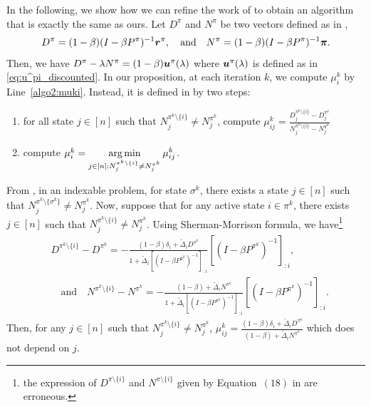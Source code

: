\documentclass[acmsmall,screen,anonymous]{acmart}
\begin{document}
In the following, we show how we can refine the work of \cite{akbarzadeh2020conditions} to obtain an algorithm that is exactly the same as ours.
Let $D^{\pi}$ and $N^{\pi}$ be two vectors defined as in \cite{akbarzadeh2020conditions},
\begin{align*}
    D^{\pi} =(1-\beta)(I-\beta P^\pi)^{-1}\boldsymbol{r}^{\pi}, \quad\text{and}\quad
    N^{\pi} =(1-\beta)(I-\beta P^\pi)^{-1}\boldsymbol{\pi}.
\end{align*}
Then, we have $D^{\pi} -\lambda N^{\pi}=(1-\beta)\boldsymbol{u}^{\pi}(\lambda)$ where $\boldsymbol{u}^{\pi}(\lambda)$ is defined as in \eqref{eq:u^pi_discounted}. In our proposition, at each iteration $k$, we compute $\mu_i^k$ by Line~\ref{algo2:muki}. Instead, it is defined in \cite{akbarzadeh2020conditions} by two steps:
\begin{enumerate}
\item for all state $j\in[n]$ such that $N_j^{\pi^k\setminus\{i\}}\neq N_j^{\pi^k}$, compute $\mu^k_{ij}=\displaystyle\frac{D_j^{\pi^k\setminus\{i\}} -D_j^{\pi^k}}{ N_j^{\pi^k\setminus\{i\}} -N_j^{\pi^k}}$ 
\item \label{it:mu^k_i*} compute $\mu^k_i=\displaystyle\operatorname*{arg\,min}_{j\in[n]:N_j^{\pi^k\setminus\{i\}}\neq N_j^{\pi^k}} \mu^k_{ij}$.
\end{enumerate}
From \cite[Theorem 2]{akbarzadeh2020conditions}, in an indexable problem, for state $\sigma^k$, there exists a state $j\in[n]$ such that $N_j^{\pi^k\setminus\{\sigma^k\}}\neq N_j^{\pi^k}$. Now, suppose that for any active state $i\in\pi^k$, there exists $j\in[n]$ such that $N_j^{\pi^k\setminus\{i\}}\neq N_j^{\pi^k}$. Using Sherman-Morrison formula, we have\footnote{the expression of $D^{\pi\setminus\{i\}}$ and $N^{\pi\setminus\{i\}}$ given by Equation~$(18)$ in \cite{akbarzadeh2020conditions} are erroneous.}
\begin{align*}
    &D^{\pi^k\setminus\{i\}} -D^{\pi^k} = -\frac{(1-\beta)\delta_i +\tilde{\Delta}_iD^{\pi^k}}{1+\tilde{\Delta}_i[(I-\beta P^{\pi^k})^{-1}]_{\colon i}}[(I-\beta P^{\pi^k})^{-1}]_{\colon i}, \\
    &\quad \text{and}\quad N^{\pi^k\setminus\{i\}} -N^{\pi^k} = -\frac{(1-\beta) +\tilde{\Delta}_iN^{\pi^k}}{1+\tilde{\Delta}_i[(I-\beta P^{\pi^k})^{-1}]_{\colon i}}[(I-\beta P^{\pi^k})^{-1}]_{\colon i}.
\end{align*}
Then, for any $j\in[n]$ such that $N_j^{\pi^k\setminus\{i\}}\neq N_j^{\pi^k}$, $\mu^k_{ij}=\displaystyle\frac{(1-\beta)\delta_i +\tilde{\Delta}_iD^{\pi^k}}{(1-\beta) +\tilde{\Delta}_iN^{\pi^k}}$ which does not depend on $j$.
\end{document}
